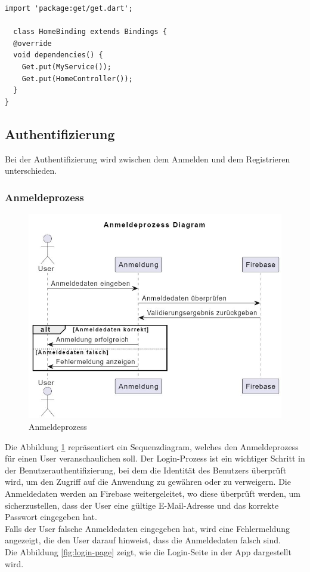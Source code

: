 \begin{lstlisting}[caption=Beispiel von einem Binding,label=lst:GetxBindingExample]
  import 'package:get/get.dart';

  class HomeBinding extends Bindings {
  @override
  void dependencies() {
    Get.put(MyService());
    Get.put(HomeController());
  }
}

\end{lstlisting}

\subsection{Authentifizierung}

Bei der Authentifizierung wird zwischen dem Anmelden und dem Registrieren unterschieden.

\subsubsection{Anmeldeprozess}

\begin{figure}[h]
  \centering
  \includegraphics[width=\textwidth]{pics/login-sequence.JPG}
  \caption{Anmeldeprozess}
  \label{fig:login-sequenze}
\end{figure}

Die Abbildung \ref{fig:login-sequenze} repräsentiert ein Sequenzdiagram, welches den Anmeldeprozess für einen User veranschaulichen soll. Der Login-Prozess ist ein wichtiger Schritt in der Benutzerauthentifizierung, bei dem die Identität des Benutzers überprüft wird, um den Zugriff auf die Anwendung zu gewähren oder zu verweigern. Die Anmeldedaten werden an Firebase weitergeleitet, wo diese überprüft werden, um sicherzustellen, dass der User eine gültige E-Mail-Adresse und das korrekte Passwort eingegeben hat.
\\
Falls der User falsche Anmeldedaten eingegeben hat, wird eine Fehlermeldung angezeigt, die den User darauf hinweist, dass die Anmeldedaten falsch sind.
\\
Die Abbildung \ref{fig:login-page} zeigt, wie die Login-Seite in der App dargestellt wird.

